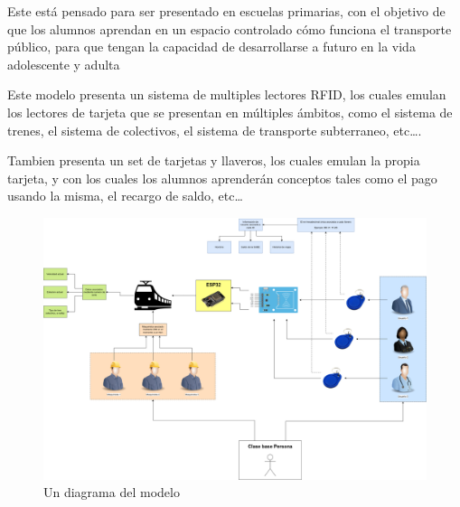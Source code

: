 \documentclass{article}
\begin{document}
Este está pensado para ser presentado en escuelas primarias, con el objetivo de
que los alumnos aprendan en un espacio controlado cómo funciona el transporte público,
para que tengan la capacidad de desarrollarse a futuro en la vida adolescente y adulta

Este modelo presenta un sistema de multiples lectores RFID, los cuales
emulan los lectores de tarjeta que se presentan en múltiples ámbitos, como el sistema
de trenes, el sistema de colectivos, el sistema de transporte subterraneo, etc\ldots.

Tambien presenta un set de tarjetas y llaveros, los cuales emulan la propia tarjeta,
y con los cuales los alumnos aprenderán conceptos tales como el pago usando la misma,
el recargo de saldo, etc\ldots
\vspace{2em}


\begin{figure}[H]
	\includegraphics[width=\textwidth]{diagrama.drawio.png}
	\centering
	\caption{Un diagrama del modelo}
\end{figure}
\end{document}
